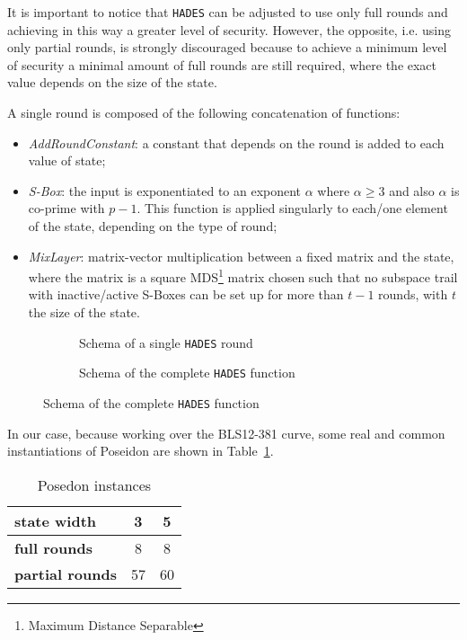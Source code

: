 \documentclass[12pt, a4paper]{report}
\begin{document}
\begin{note}
It is important to notice that \texttt{HADES} can be adjusted to use only full rounds and achieving in this way a greater level of security.
However, the opposite, i.e. using only partial rounds, is strongly discouraged because to achieve a minimum level of security a minimal amount of full rounds are still required, where the exact value depends on the size of the state.
\end{note}

A single round is composed of the following concatenation of functions:
\begin{itemize}
  \item \textit{AddRoundConstant}: a constant that depends on the round is added to each value of state;
  \item \textit{S-Box}: the input is exponentiated to an exponent $\alpha$ where $\alpha \ge 3$ and also $\alpha$ is co-prime with $p-1$. This function is applied singularly to each/one element of the state, depending on the type of round;
  \item \textit{MixLayer}: matrix-vector multiplication between a fixed matrix and the state, where the matrix is a square MDS\footnote{Maximum Distance Separable} matrix chosen such that no subspace trail with inactive/active S-Boxes can be set up for more than $t-1$ rounds, with $t$ the size of the state.
\end{itemize}

\begin{figure}
  \begin{center}
    \begin{subfigure}{0.45\textwidth}
      \caption{Schema of a single \texttt{HADES} round}\label{fig:poseidonround}
    \end{subfigure}
    \hfill
    \begin{subfigure}{0.45\textwidth}
      \caption{Schema of the complete \texttt{HADES} function}\label{fig:poseidonstructure}
    \end{subfigure}
  \end{center}
\end{figure}

In our case, because working over the BLS12-381 curve, some real and common instantiations of Poseidon are shown in Table~\ref{tab:poseidoninstances}.
\begin{table}
  \begin{center}
    \begin{tabular}{|l|c|c|}
      \hline
      \textbf{state width} & 3 & 5 \\
      \hline
      \textbf{full rounds} & 8 & 8 \\
      \hline
      \textbf{partial rounds} & 57 & 60 \\
      \hline
    \end{tabular}
  \end{center}
  \caption{Posedon instances}\label{tab:poseidoninstances}
\end{table}
\end{document}
